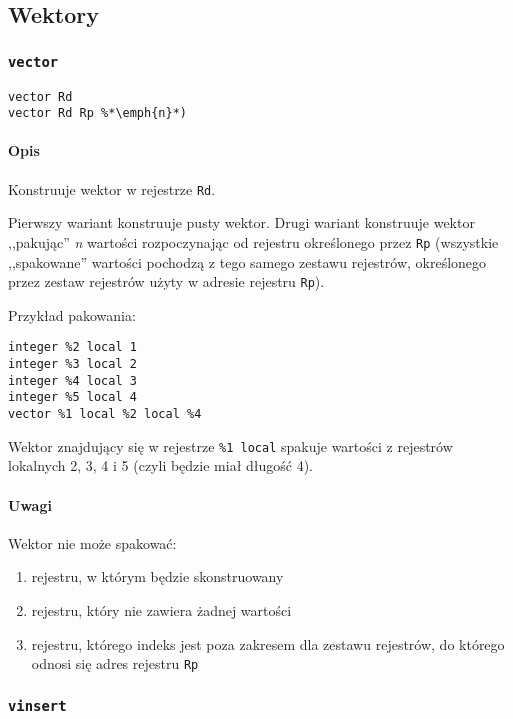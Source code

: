 \subsection{Wektory}
\label{viua_vm_ops_vector}

\subsubsection{\texttt{vector}}

\begin{lstlisting}
vector Rd
vector Rd Rp %*\emph{n}*)
\end{lstlisting}

\paragraph*{Opis} Konstruuje wektor w rejestrze \texttt{Rd}.

Pierwszy wariant konstruuje pusty wektor.
Drugi wariant konstruuje wektor ,,pakując'' \emph{n} wartości rozpoczynając od
rejestru określonego przez \texttt{Rp} (wszystkie ,,spakowane'' wartości
pochodzą z tego samego zestawu rejestrów, określonego przez zestaw rejestrów
użyty w adresie rejestru \texttt{Rp}).

Przykład pakowania:
\begin{lstlisting}
integer %2 local 1
integer %3 local 2
integer %4 local 3
integer %5 local 4
vector %1 local %2 local %4
\end{lstlisting}

Wektor znajdujący się w rejestrze \texttt{\%1 local} spakuje wartości z
rejestrów lokalnych 2, 3, 4 i 5 (czyli będzie miał długość 4).

\paragraph*{Uwagi} Wektor nie może spakować:
\begin{enumerate}
    \item rejestru, w którym będzie skonstruowany
    \item rejestru, który nie zawiera żadnej wartości
    \item rejestru, którego indeks jest poza zakresem dla zestawu rejestrów, do
        którego odnosi się adres rejestru \texttt{Rp}
\end{enumerate}

\subsubsection{\texttt{vinsert}}

